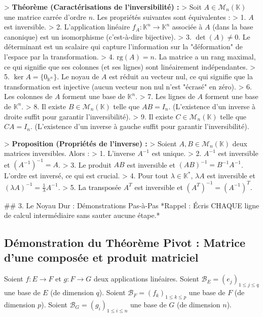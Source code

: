 \documentclass[12pt,a4paper]{report}
\begin{document}
> \textbf{Théorème (Caractérisations de l'inversibilité) :}
> Soit $A \in \mathcal{M}_n(\mathbb{K})$ une matrice carrée d'ordre $n$. Les propriétés suivantes sont équivalentes :
> 1.  $A$ est inversible.
> 2.  L'application linéaire $f_A: \mathbb{K}^n \to \mathbb{K}^n$ associée à $A$ (dans la base canonique) est un isomorphisme (c'est-à-dire bijective).
> 3.  $\det(A) \neq 0$. Le déterminant est un scalaire qui capture l'information sur la "déformation" de l'espace par la transformation.
> 4.  $\text{rg}(A) = n$. La matrice a un rang maximal, ce qui signifie que ses colonnes (et ses lignes) sont linéairement indépendantes.
> 5.  $\ker A = \{0_{\mathbb{K}^n}\}$. Le noyau de $A$ est réduit au vecteur nul, ce qui signifie que la transformation est injective (aucun vecteur non nul n'est "écrasé" en zéro).
> 6.  Les colonnes de $A$ forment une base de $\mathbb{K}^n$.
> 7.  Les lignes de $A$ forment une base de $\mathbb{K}^n$.
> 8.  Il existe $B \in \mathcal{M}_n(\mathbb{K})$ telle que $AB = I_n$. (L'existence d'un inverse à droite suffit pour garantir l'inversibilité).
> 9.  Il existe $C \in \mathcal{M}_n(\mathbb{K})$ telle que $CA = I_n$. (L'existence d'un inverse à gauche suffit pour garantir l'inversibilité).

> \textbf{Proposition (Propriétés de l'inverse) :}
> Soient $A, B \in \mathcal{M}_n(\mathbb{K})$ deux matrices inversibles. Alors :
> 1.  L'inverse $A^{-1}$ est unique.
> 2.  $A^{-1}$ est inversible et $(A^{-1})^{-1} = A$.
> 3.  Le produit $AB$ est inversible et $(AB)^{-1} = B^{-1}A^{-1}$. L'ordre est inversé, ce qui est crucial.
> 4.  Pour tout $\lambda \in \mathbb{K}^*$, $\lambda A$ est inversible et $(\lambda A)^{-1} = \frac{1}{\lambda} A^{-1}$.
> 5.  La transposée $A^T$ est inversible et $(A^T)^{-1} = (A^{-1})^T$.

## 3. Le Noyau Dur : Démonstrations Pas-à-Pas
*Rappel : Écris CHAQUE ligne de calcul intermédiaire sans sauter aucune étape.*

\subsection{Démonstration du Théorème Pivot : Matrice d'une composée et produit matriciel}
Soient $f : E \to F$ et $g : F \to G$ deux applications linéaires.
Soient $\mathcal{B}_E = (e_j)_{1 \le j \le q}$ une base de $E$ (de dimension $q$).
Soient $\mathcal{B}_F = (f_k)_{1 \le k \le p}$ une base de $F$ (de dimension $p$).
Soient $\mathcal{B}_G = (g_i)_{1 \le i \le n}$ une base de $G$ (de dimension $n$).
\end{document}
